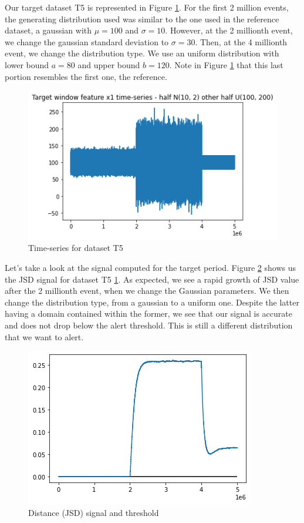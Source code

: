Our target dataset T5 is represented in Figure \ref{fig:timeseries-t5}. For the first 2 million events, the generating distribution used was similar to the one used in the reference dataset, a gaussian with $\mu=100$ and $\sigma=10$. However, at the 2 millionth event, we change the gaussian standard deviation to $\sigma=30$. Then, at the 4 millionth event, we change the distribution type. We use an uniform distribution with lower bound $a=80$ and upper bound $b=120$. Note in Figure \ref{fig:timeseries-t5} that this last portion resembles the first one, the reference.
\begin{figure}[!htb]
    \begin{center}
      \includegraphics[scale=0.6]{figures/timeseries-t5.png}
      \caption[]{Time-series for dataset T5}
      \label{fig:timeseries-t5}
    \end{center}
\end{figure}


Let's take a look at the signal computed for the target period. Figure \ref{fig:JSD-signal-test05} shows us the JSD signal for dataset T5 \ref{fig:timeseries-t5}. As expected, we see a rapid growth of JSD value after the 2 millionth event, when we change the Gaussian parameters. We then change the distribution type, from a gaussian to a uniform one. Despite the latter having a domain contained within the former, we see that our signal is accurate and does not drop below the alert threshold. This is still a different distribution that we want to alert. 
\begin{figure}[!htb]
    \begin{center}
      \includegraphics[scale=0.6]{figures/stream-analysis-viz-test05.png}
      \caption[]{Distance (JSD) signal and threshold}
      \label{fig:JSD-signal-test05}
    \end{center}
\end{figure}

